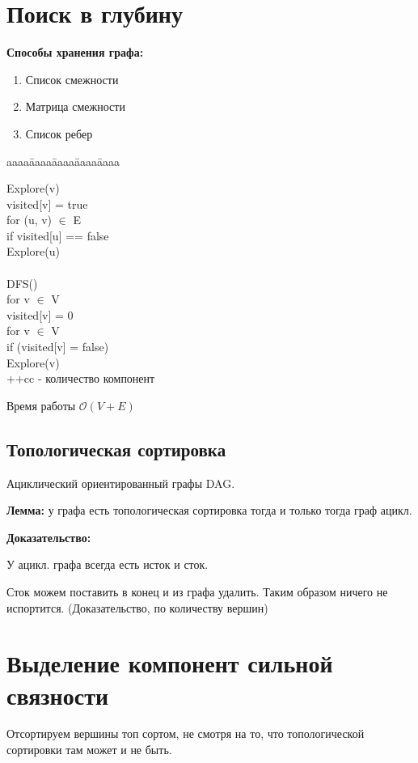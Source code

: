\documentclass[12pt]{article}
\def\t{\texttt}
\def\O{\mathcal{O}}
\newenvironment{MyTabbing}{
\t\bgroup
\begin{tabbing}
aaaa\=aaaa\=aaaa\=aaaa\=aaaa\kill
}{
\end{tabbing}
\t\egroup
}
\begin{document}
\section{Поиск в глубину}

{\bf Способы хранения графа:}
\begin{enumerate}
\item Список смежности
\item Матрица смежности
\item Список ребер
\end{enumerate}

\begin{MyTabbing}
Explore(v)\\
\>visited[v] = true\\
\>for (u, v) $\in$ E\\
\>\>if visited[u] == false\\
\>\>\>Explore(u)\\
\\
DFS()\\
\>for v $\in$ V\\
\>\>visited[v] = 0\\
\>for v $\in$ V\\
\>\>if (visited[v] = false)\\
\>\>\>Explore(v)\\
\>\>\>++cc - количество компонент
\end{MyTabbing}

Время работы $\O(V + E)$

\subsection{Топологическая сортировка}

Ациклический ориентированный графы DAG.

{\bf Лемма:} у графа есть топологическая сортировка тогда и только тогда граф ацикл.

{\bf Доказательство:}

У ацикл. графа всегда есть исток и сток.

Сток можем поставить в конец и из графа удалить. Таким образом ничего не испортится. (Доказательство, по количеству вершин)

\section{Выделение компонент сильной связности}

Отсортируем вершины топ сортом, не смотря на то, что топологической сортировки там может и не быть.
\end{document}
